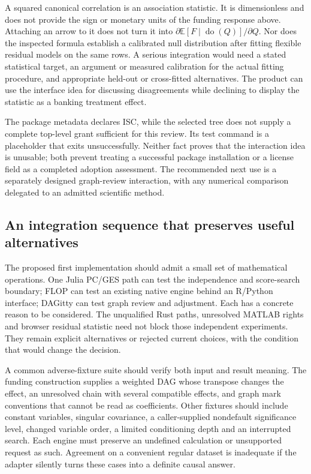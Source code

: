A squared canonical correlation is an association statistic. It is
dimensionless and does not provide the sign or monetary units of the
funding response above. Attaching an arrow to it does not turn it into
$\partial\mathbb E[F\mid\operatorname{do}(Q)]/\partial Q$.
Nor does the inspected formula establish a calibrated null distribution
after fitting flexible residual models on the same rows. A serious
integration would need a stated statistical target, an argument or measured
calibration for the actual fitting procedure, and appropriate held-out or
cross-fitted alternatives. The product can use the interface idea for
discussing disagreements while declining to display the statistic as a
banking treatment effect.

The package metadata declares ISC, while the selected tree does not supply
a complete top-level grant sufficient for this review. Its test command is
a placeholder that exits unsuccessfully. Neither fact proves that the
interaction idea is unusable; both prevent treating a successful package
installation or a license field as a completed adoption assessment.
The recommended next use is a separately designed graph-review interaction,
with any numerical comparison delegated to an admitted scientific method.

\subsection{An integration sequence that preserves useful alternatives}

The proposed first implementation should admit a small set of mathematical
operations. One Julia PC/GES path can test the independence and score-search
boundary; FLOP can test an existing native engine behind an R/Python
interface; DAGitty can test graph review and adjustment. Each has a concrete
reason to be considered. The unqualified Rust paths, unresolved MATLAB
rights and browser residual statistic need not block those independent
experiments. They remain explicit alternatives or rejected current choices,
with the condition that would change the decision.

A common adverse-fixture suite should verify both input and result meaning.
The funding construction supplies a weighted DAG whose transpose changes
the effect, an unresolved chain with several compatible effects, and graph
mark conventions that cannot be read as coefficients. Other fixtures should
include constant variables, singular covariance, a caller-supplied
nondefault significance level, changed variable order, a limited conditioning
depth and an interrupted search. Each engine must preserve an undefined
calculation or unsupported request as such. Agreement on a convenient
regular dataset is inadequate if the adapter silently turns these cases
into a definite causal answer.

